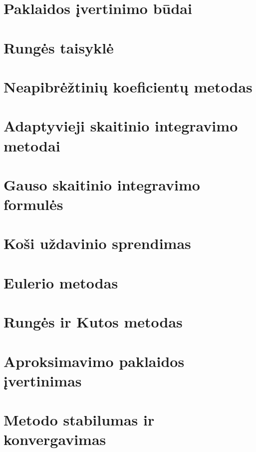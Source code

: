 \section{Paklaidos įvertinimo būdai}
\cite[189-191]{textbook}
\section{Rungės taisyklė}
\cite[190-192]{textbook}
\section{Neapibrėžtinių koeficientų metodas}
\cite[195-197]{textbook}
\section{Adaptyvieji skaitinio integravimo metodai}
\cite[193-194]{textbook}
\section{Gauso skaitinio integravimo formulės}
\cite[200-204]{textbook}

\cite[9-42]{textbook-differential-equations}
\section{Koši uždavinio sprendimas}
\section{Eulerio metodas}
\section{Rungės ir Kutos metodas}
\section{Aproksimavimo paklaidos įvertinimas}
\section{Metodo stabilumas ir konvergavimas}

